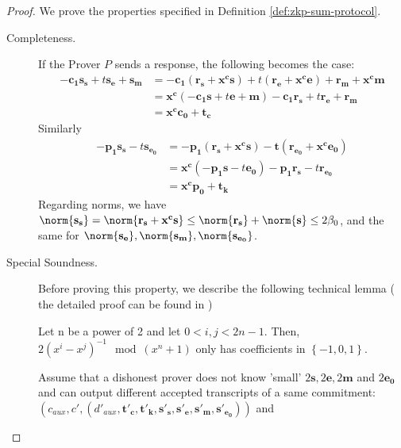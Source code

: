 \begin{proof}
  We prove the properties specified in Definition \ref{def:zkp-sum-protocol}.
  \begin{description}
  \item[Completeness.] If the Prover $P$ sends a response, the following becomes the case:
    \begin{align*}
      -\mathbf{c_1s_s} + t\mathbf{s_e} + \mathbf{s_m} &= -\mathbf{c_1(r_s +
                                                        x^cs)} + t(\mathbf{r_e + x^ce}) + \mathbf{r_m + x^cm} \\
                                                      &= \mathbf{x^c}(-\mathbf{c_1s} +t\mathbf{e} + \mathbf{m})
                                                        -\mathbf{c_1r_s} + t\mathbf{r_e} + \mathbf{r_m}\\
                                                      &=\mathbf{x^cc_0} + \mathbf{t_c}
    \end{align*}
    Similarly
    \begin{align*}
      -\mathbf{p_1s_s} -t\mathbf{s_{e_0}} &= -\mathbf{p_1(r_s +
                                            x^cs) - t(\mathbf{r_{e_0} + x^ce_0})}\\
                                          &= \mathbf{x^c}(\mathbf{-p_1s} - t\mathbf{e_0}) -\mathbf{p_1r_s}
                                            -t\mathbf{r_{e_0}} \\
                                          &= \mathbf{x^cp_0 + t_k}
    \end{align*}
    Regarding norms, we have $\norm{\mathbf{s_s}} = \norm{\mathbf{r_s +
        x^cs}} \leq
    \norm{\mathbf{r_s}} + \norm{\mathbf{s}} \leq 2\beta_0$, and
    the same for $\mathbf{\norm{s_e}, \norm{s_m}, \norm{s_{e_0}}}$.
  \item [Special Soundness.] Before proving this property, we describe the
    following technical lemma ( the detailed proof can be found in
    \cite{benhamouda2014better})
    \begin{lemma}
      Let n be a power of 2 and let $0 <i,j< 2n-1$. Then, $2(x^i -
      x^j)^{-1} \mod (x^n +1)$ only has coefficients in $\left\{ -1,
        0, 1
      \right\}$.
      \label{lem:speicalBinomial}
    \end{lemma}
    Assume that a dishonest prover does not know 'small'
    $2\mathbf{s}, 2\mathbf{e}, 2\mathbf{m}$ and $2\mathbf{e_0}$ and can
    output different accepted transcripts of a same commitment: $(c_{aux}, c',
    (d'_{aux},\mathbf{t'_c, t'_k, s'_s, s'_e, s'_m, s'_{e_0}}))$ and

\end{description}
\end{proof}

